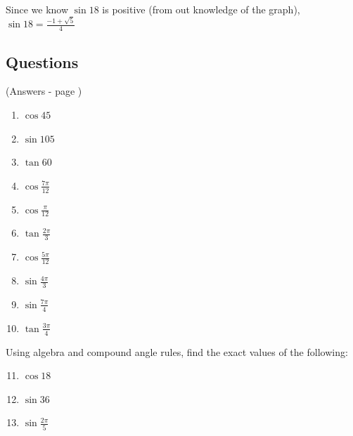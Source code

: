 \documentclass[../main.tex]{subfiles}
\begin{document}
Since we know $\sin{18}$ is positive (from out knowledge of the graph), $\sin{18}=\frac{-1+\sqrt{5}}{4}$

\pagebreak

\subsection*{Questions} 
\label{Exact trig values}
(Answers - page {\pageref{Exact trig values answers}})
\begin{enumerate}
    \item $\cos{45}$

    \item $\sin{105}$
    
    \item $\tan{60}$
    
    \item $\cos{\frac{7\pi}{12}}$
    
    \item $\cos{\frac{\pi}{12}}$
    
    \item $\tan{\frac{2\pi}{3}}$
    
    \item $\cos{\frac{5\pi}{12}}$
    
    \item $\sin{\frac{4\pi}{3}}$
    
    \item $\sin{\frac{7\pi}{4}}$
    
    \item $\tan{\frac{3\pi}{4}}$

\end{enumerate}
Using algebra and compound angle rules, find the exact values of the following:
\begin{enumerate}
    \setcounter{enumi}{10}
    \item $\cos{18}$
    
    \item $\sin{36}$
    
    \item $\sin{\frac{2\pi}{5}}$
    
\end{enumerate}
\end{document}
